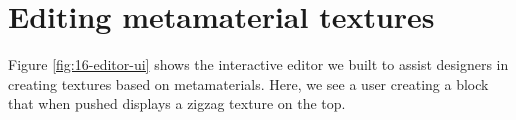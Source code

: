 








\section{Editing metamaterial textures}

Figure \ref{fig:16-editor-ui} shows the interactive editor we built to assist designers in creating textures based on metamaterials. Here, we see a user creating a block that when pushed displays a zigzag texture on the top. 

